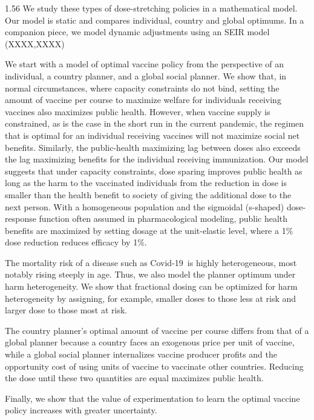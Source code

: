 \documentclass[12pt]{article}
\newcommand{\covid}{Covid-19}
\begin{document}
\begin{spacing}{1.56}
We study these types of dose-stretching policies in a mathematical
model. Our model is static and compares individual, country and global
optimums. In a companion piece, we model dynamic adjustments using an
SEIR model (XXXX,XXXX)

We start with a model of optimal vaccine policy from the perspective
of an individual, a country planner, and a global social planner. We
show that, in normal circumstances, where capacity constraints do not
bind, setting the amount of vaccine per course to maximize welfare for
individuals receiving vaccines also maximizes public health. However,
when vaccine supply is constrained, as is the case in the short run in
the current pandemic, the regimen that is optimal for an individual
receiving vaccines will not maximize social net benefits. Similarly,
the public-health maximizing lag between doses also exceeds the lag
maximizing benefits for the individual receiving immunization. Our
model suggests that under capacity constraints, dose sparing improves
public health as long as the harm to the vaccinated individuals from
the reduction in dose is smaller than the health benefit to society of
giving the additional dose to the next person. With a homogeneous
population and the sigmoidal (s-shaped) dose-response function often
assumed in pharmacological modeling, public health benefits are
maximized by setting dosage at the unit-elastic level, where a 1\%
dose reduction reduces efficacy by 1\%.

The mortality risk of a disease such as \covid\ is highly
heterogeneous, most notably rising steeply in age. Thus, we also model
the planner optimum under harm heterogeneity. We show that fractional
dosing can be optimized for harm heterogeneity by assigning, for
example, smaller doses to those less at risk and larger dose to those
most at risk.

The country planner's optimal amount of vaccine per course differs
from that of a global planner because a country faces an exogenous
price per unit of vaccine, while a global social planner internalizes
vaccine producer profits and the opportunity cost of using units of
vaccine to vaccinate other countries. Reducing the dose until these
two quantities are equal maximizes public health.

Finally, we show that the value of experimentation to learn the
optimal vaccine policy increases with greater uncertainty.



\end{spacing}
\end{document}
